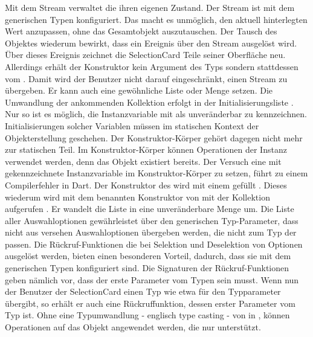 Mit dem Stream  verwaltet die  ihren eigenen Zustand.
Der Stream ist mit dem generischen Typen  konfiguriert.
Das macht es unmöglich, den aktuell hinterlegten Wert anzupassen, ohne das Gesamtobjekt auszutauschen.
Der Tausch des Objektes wiederum bewirkt, dass ein Ereignis über den Stream ausgelöst wird. Über dieses Ereignis zeichnet die SelectionCard Teile seiner Oberfläche neu. Allerdings erhält der Konstruktor kein Argument des Typs  sondern stattdessen vom  . Damit wird der Benutzer nicht darauf eingeschränkt, einen Stream zu übergeben. Er kann auch eine gewöhnliche Liste oder Menge setzen. Die Umwandlung der ankommenden Kollektion erfolgt in der Initialisierungsliste . Nur so ist es möglich, die Instanzvariable mit  als unveränderbar zu kennzeichnen. Initialisierungen solcher Variablen müssen im statischen Kontext der Objekterstellung geschehen. Der Konstruktor-Körper gehört dagegen nicht mehr zur statischen Teil. Im Konstruktor-Körper können Operationen der Instanz verwendet werden, denn das Objekt existiert bereits. Der Versuch eine mit  gekennzeichnete Instanzvariable im Konstruktor-Körper zu setzen, führt zu einem Compilerfehler in Dart. Der Konstruktor  des  wird mit einem  gefüllt . Dieses wiederum wird mit dem benannten Konstruktor  von  mit der Kollektion aufgerufen . Er wandelt die  Liste in eine unveränderbare Menge um. Die Liste aller Auswahloptionen   gewährleistet über den generischen Typ-Parameter, dass nicht aus versehen Auswahloptionen übergeben werden, die nicht zum Typ der  passen. Die Rückruf-Funktionen  die bei Selektion und Deselektion von Optionen ausgelöst werden, bieten einen besonderen Vorteil, dadurch, dass sie mit dem generischen Typen konfiguriert sind. Die Signaturen der Rückruf-Funktionen  geben nämlich vor, dass der erste Parameter vom Typen  sein musst. Wenn nun der Benutzer der SelectionCard einen Typ wie etwa  für den Typparameter übergibt, so erhält er auch eine Rückruffunktion, dessen erster Parameter vom Typ  ist. Ohne eine Typumwandlung - englisch type casting - von  in , können Operationen auf das Objekt angewendet werden, die nur  unterstützt. 

